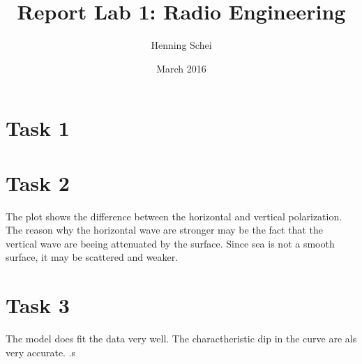 \documentclass{article}
\title{Report Lab 1: Radio Engineering}
\author{Henning Schei}
\date{March 2016}
\begin{document}
\maketitle

\section{Task 1}
\section{Task 2}
The plot shows the difference between the horizontal and vertical polarization. The reason why the horizontal wave are stronger may be the fact that the vertical wave are beeing attenuated by the surface. Since sea is not a smooth surface, it may be scattered and weaker. 

\section {Task 3}
		The model does fit the data very well. The charactheristic dip in the curve are als very accurate. .s
\end{document}
